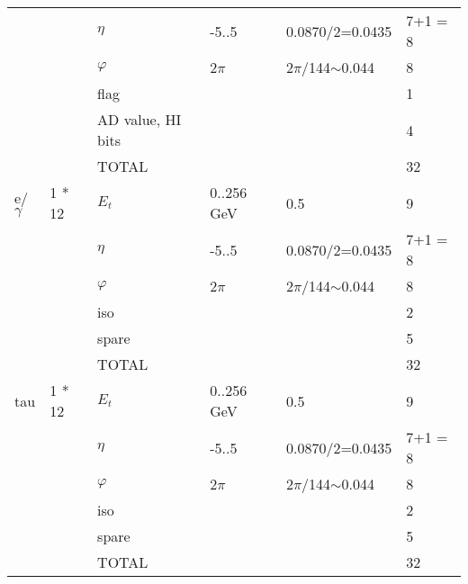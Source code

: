\documentclass{cmspaper}
\begin{document}
\begin{table}[ht]
\begin{tabular}{| l | l | l | l | l | l |}
	&		&	$\eta$	&	-5..5	&	0.0870/2=0.0435	&	7+1 = 8                    \\
	&		&	$\varphi$	&	2$\pi$	&	2$\pi$/144$\sim$0.044	&	8                    \\
	&		&	flag	&		&		&	1                    \\
	&		&	AD value, HI bits	&		&		&	4                    \\
	&		&	TOTAL	&		&		&	32                    \\
\hline
e/$\gamma$	&	1 * 12	&	$E_t$	&	0..256 GeV	&	0.5	&	9                    \\
	&		&	$\eta$	&	-5..5	&	0.0870/2=0.0435	&	7+1 = 8                    \\
	&		&	$\varphi$	&	2$\pi$	&	2$\pi$/144$\sim$0.044	&	8                    \\
	&		&	iso	&		&		&	2                    \\
	&		&	spare	&		&		&	5                    \\
	&		&	TOTAL	&		&		&	32                    \\
\hline
tau	&	1 * 12	&	$E_t$	&	0..256 GeV	&	0.5	&	9                    \\
	&		&	$\eta$	&	-5..5	&	0.0870/2=0.0435	&	7+1 = 8                    \\
	&		&	$\varphi$	&	2$\pi$	&	2$\pi$/144$\sim$0.044	&	8                    \\
	&		&	iso	&		&		&	2                    \\
	&		&	spare	&		&		&	5                    \\
	&		&	TOTAL	&		&		&	32                    \\
\hline
\end{tabular}
\label{table:scales_table_1}
\end{table}
\end{document}
